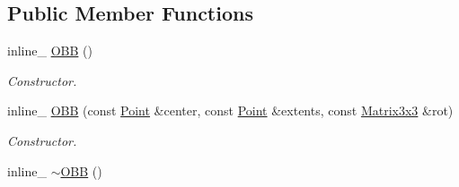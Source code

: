 \subsection*{Public Member Functions}
\begin{DoxyCompactItemize}
\item 
inline\+\_\+ \hyperlink{classOBB_a623ea9ac0e503fc643e91105d8dd1c29}{O\+BB} ()\hypertarget{classOBB_a623ea9ac0e503fc643e91105d8dd1c29}{}\label{classOBB_a623ea9ac0e503fc643e91105d8dd1c29}

\begin{DoxyCompactList}\small\item\em Constructor. \end{DoxyCompactList}\item 
inline\+\_\+ \hyperlink{classOBB_aeaefb4753bda0abd28f063d9c7ff9300}{O\+BB} (const \hyperlink{classPoint}{Point} \&center, const \hyperlink{classPoint}{Point} \&extents, const \hyperlink{classMatrix3x3}{Matrix3x3} \&rot)\hypertarget{classOBB_aeaefb4753bda0abd28f063d9c7ff9300}{}\label{classOBB_aeaefb4753bda0abd28f063d9c7ff9300}

\begin{DoxyCompactList}\small\item\em Constructor. \end{DoxyCompactList}\item 
inline\+\_\+ \hyperlink{classOBB_af7e5c42b99c8b4376a68922c8d586b87}{$\sim$\+O\+BB} ()\hypertarget{classOBB_af7e5c42b99c8b4376a68922c8d586b87}{}\label{classOBB_af7e5c42b99c8b4376a68922c8d586b87}


\end{DoxyCompactItemize}
